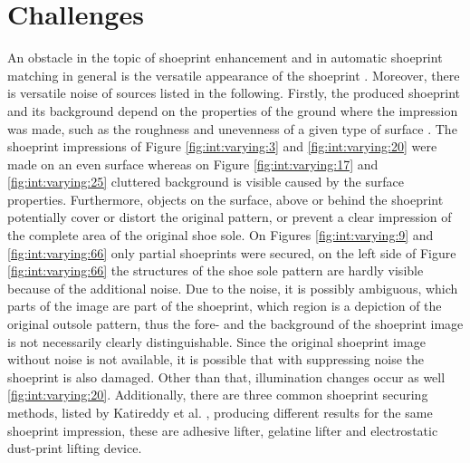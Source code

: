 \documentclass[draft,final]{vutinfth} %
\begin{document}
\section{Challenges}
\par
An obstacle in the topic of shoeprint enhancement and in automatic shoeprint matching in general is the versatile appearance of the shoeprint \cite{kong2017cross}.
Moreover, there is versatile noise of sources listed in the following.
Firstly, the produced shoeprint and its background depend on the properties of the ground where the impression was made, such as the roughness and unevenness of a given type of surface \cite{shor2018inherent}.
The shoeprint impressions of Figure \ref{fig:int:varying:3} and \ref{fig:int:varying:20} were made on an even surface whereas on Figure \ref{fig:int:varying:17} and \ref{fig:int:varying:25} cluttered background is visible caused by the surface properties.
Furthermore, objects on the surface, above or behind the shoeprint potentially cover or distort the original pattern, or prevent a clear impression of the complete area of the original shoe sole.
On Figures \ref{fig:int:varying:9} and \ref{fig:int:varying:66} only partial shoeprints were secured, on the left side of Figure \ref{fig:int:varying:66} the structures of the shoe sole pattern are hardly visible because of the additional noise.
Due to the noise, it is possibly ambiguous, which parts of the image are part of the shoeprint, which region is a depiction of the original outsole pattern, thus the fore- and the background of the shoeprint image is not necessarily clearly distinguishable.
Since the original shoeprint image without noise is not available, it is possible that with  suppressing noise the shoeprint is also damaged.
Other than that, illumination changes occur as well \ref{fig:int:varying:20}.
Additionally, there are three common shoeprint securing methods, listed by Katireddy et al. \cite{katireddy2017novel}, producing different results for the same shoeprint impression, these are adhesive lifter, gelatine lifter and electrostatic dust-print lifting device. 
\end{document}
